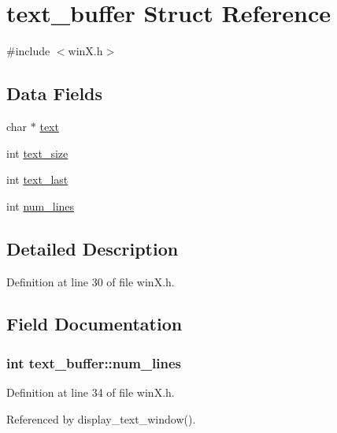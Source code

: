 \hypertarget{structtext__buffer}{\section{text\+\_\+buffer Struct Reference}
\label{structtext__buffer}
}


{\ttfamily \#include $<$win\+X.\+h$>$}

\subsection*{Data Fields}
\begin{DoxyCompactItemize}
\item 
char $\ast$ \hyperlink{structtext__buffer_addf46d0312deaf1c33baacc8fd147acb}{text}
\item 
int \hyperlink{structtext__buffer_ac664b06fbe050d6bf4058fdcd42e6076}{text\+\_\+size}
\item 
int \hyperlink{structtext__buffer_ae35a9a063efe6fe0686ddd0243422219}{text\+\_\+last}
\item 
int \hyperlink{structtext__buffer_afd2611bf52cc00933ff169370a8799cf}{num\+\_\+lines}
\end{DoxyCompactItemize}


\subsection{Detailed Description}


Definition at line 30 of file win\+X.\+h.



\subsection{Field Documentation}
\hypertarget{structtext__buffer_afd2611bf52cc00933ff169370a8799cf}{
\subsubsection[{num\+\_\+lines}]{\setlength{\rightskip}{0pt plus 5cm}int text\+\_\+buffer\+::num\+\_\+lines}}\label{structtext__buffer_afd2611bf52cc00933ff169370a8799cf}


Definition at line 34 of file win\+X.\+h.



Referenced by display\+\_\+text\+\_\+window().

